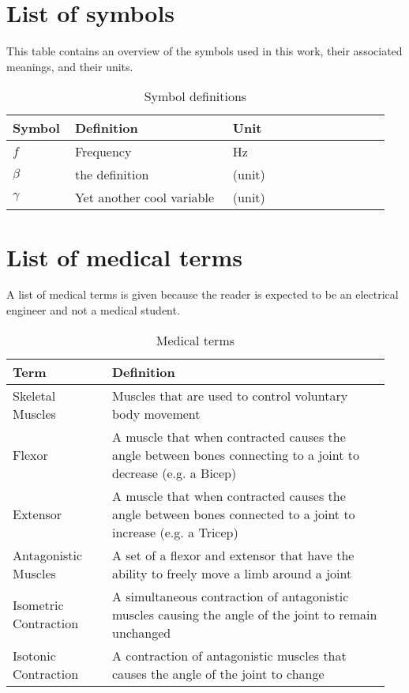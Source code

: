 \section{List of symbols}
This table contains an overview of the symbols used in this work, their associated meanings, and their units.

\begin{table}[H]
    \centering
    \begin{tabular}{p{0.15\linewidth} | p{0.4\linewidth} | p{0.4\linewidth}}
    Symbol & Definition & Unit \\ \hline
    $f$ & Frequency & Hz \\ 
    $\beta$ & the definition & (unit) \\
    $\gamma$ & Yet another cool variable & (unit)
    \end{tabular}
    \caption{Symbol definitions}
    \label{tab:symbol_definitions}
\end{table}

\section{List of medical terms}
A list of medical terms is given because the reader is expected to be an electrical engineer and not a medical student.
\begin{table}[H]
    \centering
    \begin{tabular}{p{0.25\linewidth} | p{0.7\linewidth}}
    Term & Definition \\ \hline
    Skeletal Muscles & Muscles that are used to control voluntary body movement \\
    Flexor & A muscle that when contracted causes the angle between bones connecting to a joint to decrease (e.g. a Bicep) \\
    Extensor & A muscle that when contracted causes the angle between bones connected to a joint to increase (e.g. a Tricep) \\
    Antagonistic Muscles & A set of a flexor and extensor that have the ability to freely move a limb around a joint \\ 
    Isometric Contraction & A simultaneous contraction of antagonistic muscles causing the angle of the joint to remain unchanged \\
    Isotonic Contraction & A contraction of antagonistic muscles that causes the angle of the joint to change \\
    \end{tabular}
    \caption{Medical terms}
    \label{tab:medical_definitions}
\end{table}